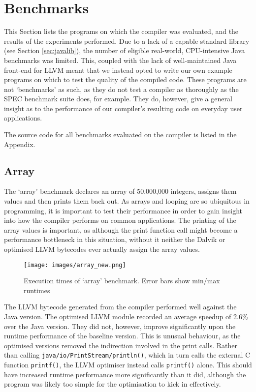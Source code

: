 \section{Benchmarks}
\label{sec:benchmarks}

This Section lists the programs on which the compiler was evaluated, and the results of the experiments performed. Due to a lack of a capable standard library (see Section \ref{sec:javalib}), the number of eligible real-world, CPU-intensive Java benchmarks was limited. This, coupled with the lack of well-maintained Java front-end for LLVM meant that we instead opted to write our own example programs on which to test the quality of the compiled code. These programs are not `benchmarks' as such, as they do not test a compiler as thoroughly as the SPEC benchmark suite does, for example. They do, however, give a general insight as to the performance of our compiler's resulting code on everyday user applications.

The source code for all benchmarks evaluated on the compiler is listed in the Appendix.

\subsection*{Array}

The `array' benchmark declares an array of 50,000,000 integers, assigns them values and then prints them back out. As arrays and looping are so ubiquitous in programming, it is important to test their performance in order to gain insight into how the compiler performs on common applications. The printing of the array values is important, as although the print function call might become a performance bottleneck in this situation, without it neither the Dalvik or optimised LLVM bytecodes ever actually assign the array values.

\begin{figure}[h!]
    \centering
    \texttt{[image: images/array\_new.png]}
    \caption[Execution times of `array' benchmark]{Execution times of `array' benchmark. Error bars show min/max runtimes}
    \label{fig:res_array}
\end{figure}

The LLVM bytecode generated from the compiler performed well against the Java version. The optimised LLVM module recorded an average speedup of 2.6\% over the Java version. They did not, however, improve significantly upon the runtime performance of the baseline version. This is unusual behaviour, as the optimised versions removed the indirection involved in the print calls. Rather than calling \verb|java/io/PrintStream/println()|, which in turn calls the external C function \verb|printf()|, the LLVM optimiser instead calls \verb|printf()| alone. This should have increased runtime performance more significantly than it did, although the program was likely too simple for the optimisation to kick in effectively.

